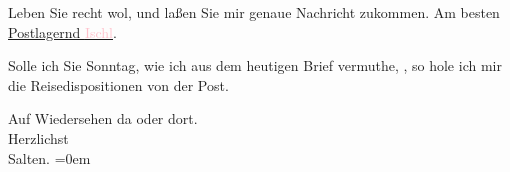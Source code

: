 \pstart
           {\pb}Leben Sie recht wol, und
               laßen Sie mir genaue Nachricht zukommen. Am besten \uline{Postlagernd \textcolor{pink}{Ischl}{}\ledrightnote{\textcolor{pink}{Bad Ischl}}}.\pend
           
\pstart
           Solle ich Sie Sonntag, wie ich aus dem heutigen Brief
               vermuthe, \label{K_L03308-4v}\label{K_L03308-4h}, so hole ich mir die
               Reisedispositionen von der Post.\pend
           
\pstart
           Auf Wiedersehen da oder dort. {\\[\baselineskip]}Herzlichst {\\[\baselineskip]}\spacefill\mbox{Salten.}\pend
           \leftskip=0em{}\endnumbering{}  
      